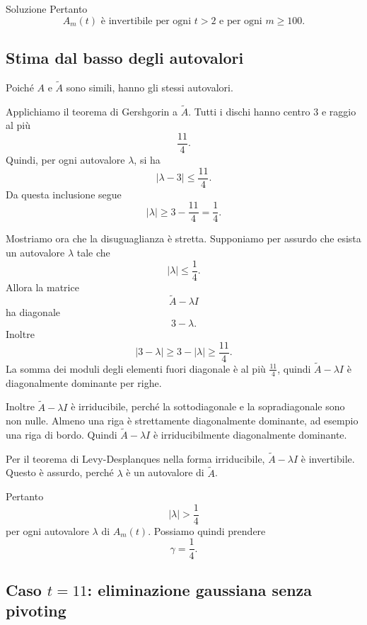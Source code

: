\documentclass[a4paper]{article}
\begin{document}
\begin{snippetsolution}{Soluzione}
    Pertanto
    \[
        \boxed{
            A_m(t)\text{ è invertibile per ogni }t>2\text{ e per ogni }m\geq 100.
        }
    \]

    \subsection*{Stima dal basso degli autovalori}

    Poiché \(A\) e \(\widetilde A\) sono simili, hanno gli stessi autovalori.

    Applichiamo il teorema di Gershgorin a \(\widetilde A\). Tutti i dischi hanno centro \(3\) e raggio al più
    \[
        \frac{11}{4}.
    \]
    Quindi, per ogni autovalore \(\lambda\), si ha
    \[
        |\lambda-3|\leq \frac{11}{4}.
    \]
    Da questa inclusione segue
    \[
        |\lambda|
        \geq
        3-\frac{11}{4}
        =
        \frac14.
    \]

    Mostriamo ora che la disuguaglianza è stretta. Supponiamo per assurdo che esista un autovalore \(\lambda\) tale che
    \[
        |\lambda|\leq \frac14.
    \]
    Allora la matrice
    \[
        \widetilde A-\lambda I
    \]
    ha diagonale
    \[
        3-\lambda.
    \]
    Inoltre
    \[
        |3-\lambda|
        \geq
        3-|\lambda|
        \geq
        \frac{11}{4}.
    \]
    La somma dei moduli degli elementi fuori diagonale è al più \(\frac{11}{4}\), quindi \(\widetilde A-\lambda I\) è diagonalmente dominante per righe.

    Inoltre \(\widetilde A-\lambda I\) è irriducibile, perché la sottodiagonale e la sopradiagonale sono non nulle. Almeno una riga è strettamente diagonalmente dominante, ad esempio una riga di bordo. Quindi \(\widetilde A-\lambda I\) è irriducibilmente diagonalmente dominante.

    Per il teorema di Levy-Desplanques nella forma irriducibile, \(\widetilde A-\lambda I\) è invertibile. Questo è assurdo, perché \(\lambda\) è un autovalore di \(\widetilde A\).

    Pertanto
    \[
        |\lambda|>\frac14
    \]
    per ogni autovalore \(\lambda\) di \(A_m(t)\). Possiamo quindi prendere
    \[
        \boxed{
            \gamma=\frac14.
        }
    \]

    \subsection*{Caso \(t=11\): eliminazione gaussiana senza pivoting}


\end{snippetsolution}
\end{document}
